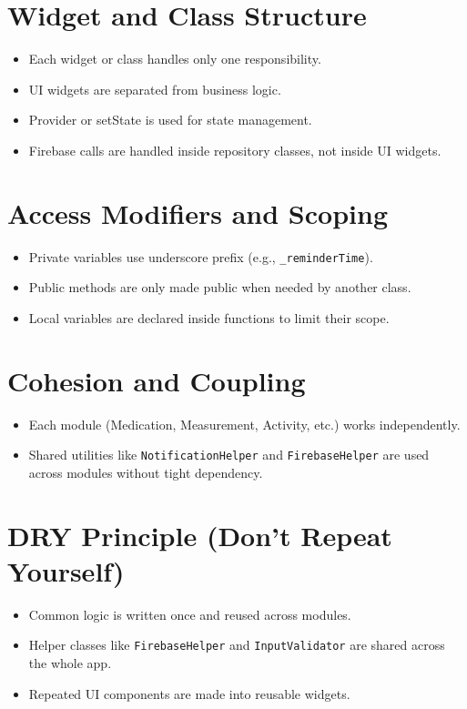 \section{Widget and Class Structure}
\begin{itemize}
    \item Each widget or class handles only one responsibility.
    \item UI widgets are separated from business logic.
    \item Provider or setState is used for state management.
    \item Firebase calls are handled inside repository classes, not inside UI widgets.
\end{itemize}

\section{Access Modifiers and Scoping}
\begin{itemize}
    \item Private variables use underscore prefix (e.g., \texttt{\_reminderTime}).
    \item Public methods are only made public when needed by another class.
    \item Local variables are declared inside functions to limit their scope.
\end{itemize}

\section{Cohesion and Coupling}
\begin{itemize}
    \item Each module (Medication, Measurement, Activity, etc.) works independently.
    \item Shared utilities like \texttt{NotificationHelper} and \texttt{FirebaseHelper} are used across modules without tight dependency.
\end{itemize}

\section{DRY Principle (Don't Repeat Yourself)}
\begin{itemize}
    \item Common logic is written once and reused across modules.
    \item Helper classes like \texttt{FirebaseHelper} and \texttt{InputValidator} are shared across the whole app.
    \item Repeated UI components are made into reusable widgets.
\end{itemize}

